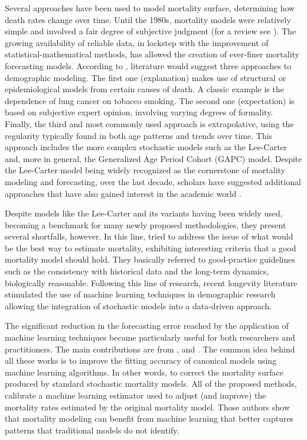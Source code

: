 \documentclass[fleqn,10pt]{wlscirep}
\begin{document}
Several approaches have been used to model mortality surface, determining how death rates change over time. Until the 1980s, mortality models were relatively simple and involved a fair degree of subjective judgment (for a review see \cite{Pollard}). The growing availability of reliable data, in lockstep with the improvement of statistical-mathematical methods, has allowed the creation of ever-finer mortality forecasting models. According to \cite{Booth}, literature would suggest three approaches to demographic modeling. The first one (explanation) makes use of structural or epidemiological models from certain causes of death. A classic example is the dependence of lung cancer on tobacco smoking. The second one (expectation) is based on subjective expert opinion, involving varying degrees of formality. Finally, the third and most commonly used approach is extrapolative, using the regularity typically found in both age patterns and trends over time.
This approach includes the more complex stochastic models such as the Lee-Carter \cite{LC92} and, more in general, the Generalized Age Period Cohort (GAPC) model. Despite the Lee-Carter model being widely recognized as the cornerstone of mortality modeling and forecasting, over the last decade, scholars have suggested additional approaches that have also gained interest in the academic world \cite{BDV2002,RH,CBD06,CBD09}.

Despite models like the Lee-Carter and its variants having been widely used, becoming a benchmark for many newly proposed methodologies, they present several shortfalls, however. 
In this line, \cite{CBD08} tried to address the issue of what would be the best way to estimate mortality, exhibiting interesting criteria that a good mortality model should hold. They basically referred to good-practice guidelines such as the consistency with historical data and the long-term dynamics, biologically reasonable. Following this line of research, recent longevity literature stimulated the use of machine learning techniques in demographic research allowing the integration of stochastic models into a data-driven approach. 

The significant reduction in the forecasting error reached by the application of machine learning techniques became particularly useful for both researchers and practitioners. The main contributions are from \cite{Deprez}, \cite{LevPiz} and \cite{LevNi}. The common idea behind all these works is to improve the fitting accuracy of canonical models using machine learning algorithms. In other words, to correct the mortality surface produced by standard stochastic mortality models. All of the proposed methods, calibrate a machine learning estimator used to adjust (and improve) the mortality rates estimated by the original mortality model. Those authors show that mortality modeling can benefit from machine learning that better captures patterns that traditional models do not identify. 
\end{document}
